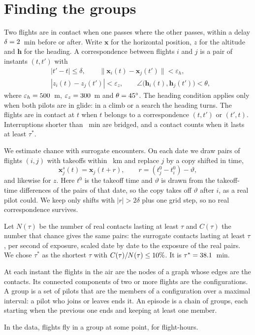 \section{Finding the groups}\label{app:groups}

Two flights are in contact when one passes where the other passes, within a delay
$\delta=2$~min before or after. Write $\mathbf{x}$ for the horizontal position, $z$ for
the altitude and $\mathbf{h}$ for the heading. A correspondence between flights $i$ and $j$ is a
pair of instants $(t,t')$ with
\begin{align}
&|t'-t|\le\delta,\qquad
\|\mathbf{x}_i(t)-\mathbf{x}_j(t')\|<\varepsilon_h,\nonumber\\
&|z_i(t)-z_j(t')|<\varepsilon_z,\qquad
\angle\bigl(\mathbf{h}_i(t),\mathbf{h}_j(t')\bigr)<\theta ,
\end{align}
where $\varepsilon_h=500$~m, $\varepsilon_z=300$~m and $\theta=45^\circ$. The heading
condition applies only when both pilots are in glide: in a climb or a search the heading turns.
The flights are in contact at $t$ when $t$ belongs to a correspondence $(t,t')$ or $(t',t)$.
Interruptions shorter than \LtGapMin~min are bridged, and a contact counts when it lasts at least
$\tau^*$.

We estimate chance with surrogate encounters. On each date we draw pairs of flights $(i,j)$ with
takeoffs within \LtNullRadiusKm~km and replace $j$ by a copy shifted in time,
\begin{equation}
\mathbf{x}^s_j(t)=\mathbf{x}_j(t+r),\qquad r=(t^0_j-t^0_i)-\vartheta ,
\end{equation}
and likewise for $z$. Here $t^0$ is the takeoff time and $\vartheta$ is drawn from the takeoff-time
differences of the pairs of that date, so the copy takes off $\vartheta$ after $i$, as a real pilot
could. We keep only shifts with $|r|>2\delta$ plus one grid step, so no real correspondence
survives.

Let $N(\tau)$ be the number of real contacts lasting at least $\tau$ and $C(\tau)$ the number that
chance gives the same pairs: the surrogate contacts lasting at least $\tau$, per second of exposure,
scaled date by date to the exposure of the real pairs. We chose $\tau^*$ as the shortest $\tau$ with
$C(\tau)/N(\tau)\le10\%$. It is $\tau^*=38.1$~min.

At each instant the flights in the air are the nodes of a graph whose edges are the contacts. Its
connected components of two or more flights are the configurations. A group is a set of pilots that
are the members of a configuration over a maximal interval: a pilot who joins or leaves ends it.
An episode is a chain of groups, each starting when the previous one ends and keeping at least one
member.

In the data, \LtGroupFlights{} flights fly in a group at some point, for \LtGroupHours{}
flight-hours.
